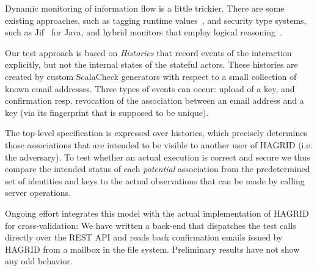 \documentclass{llncs}
\begin{document}
Dynamic monitoring of information flow is a little trickier.
There are some existing approaches, such as tagging runtime values~\cite{austin2009efficient},
and security type systems, such as Jif~\cite{myers2001jif} for Java,
and hybrid monitors that employ logical reasoning~\cite{chudnov2014information}.

Our test approach is based on \emph{Histories} that record events of the interaction explicitly, but not the internal states of the stateful actors.
These histories are created by custom ScalaCheck generators with respect to a small collection of known email addresses.
Three types of events can occur: upload of a key, and confirmation resp. revocation of the association between an email address and a key (via its fingerprint that is supposed to be unique).

The top-level specification is expressed over histories, which precisely determines those associations that are intended to be visible to another user of HAGRID (i.e. the adversary).
To test whether an actual execution is correct and secure we thus compare the intended status of each \emph{potential} association from the predetermined set of identities and keys to the actual observations that can be made by calling server operations.

Ongoing effort integrates this model with the actual implementation of HAGRID for cross-validation: We have written a back-end that dispatches the test calls directly over the REST API and reads back confirmation emails issued by HAGRID from a mailbox in the file system. Preliminary results have not show any odd behavior.

% 



\end{document}
